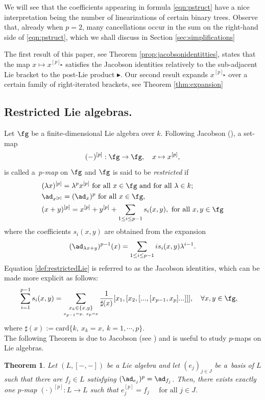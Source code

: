 \documentclass[12pt]{article}
\newcommand{\btr}{\blacktriangleright}
\newtheorem{theorem}{Theorem}[subsection]
\begin{document}
We will see that the coefficients appearing in formula \eqref{eqn:pstruct} have a nice interpretation being the number of linearizations of certain binary trees. Observe that, already when $p=2$, many cancellations occur in the sum on the right-hand side of \eqref{eqn:pstruct}, which we shall discuss in Section \ref{sec:simplifications} 

The first result of this paper, see Theorem \ref{prop:jacobsonidentitties}, states that the map $x \mapsto x^{[p]_{\btr}}$ satisfies the Jacobson identities relatively to the sub-adjacent Lie bracket to the post-Lie product $\btr$. Our second result expands $x^{[p]_{\btr}}$ over a certain family of right-iterated brackets, see Theorem \ref{thm:expansion}

 \subsection{Restricted Lie algebras.}\label{sec:restrictedLie}Let $\fg$ be a finite-dimensional Lie algebra over $k$. Following Jacobson (\cite{J}), a set-map 
    $$(-)^{[p]}:\fg\rightarrow \fg, \quad x\mapsto x^{[p]},
    $$ is called a~\textit{$p$-map} on $\fg$ and $\fg$ is said to be {\it restricted}  if 
\begin{align}
\label{def:restrictedLie}
&(\lambda x)^{[p]}=\lambda^p x^{[p]} \text{ for all } x\in \fg \text{ and for all } \lambda \in k; \nonumber\\
&\ad_{x^{[p]}}=(\ad_x)^p \text{ for all } x\in \fg, \nonumber \\
&(x+y)^{[p]}=x^{[p]}+y^{[p]}+\displaystyle\sum_{1\leq i\leq p-1}s_i(x,y), \text{ for all } x,y\in \fg 
\end{align}
where the coefficients $s_i(x,y)$ are obtained from the expansion
\begin{equation*}
(\ad_{\lambda x+y})^{p-1}(x)=\displaystyle\sum_{1\leq i \leq p-1} is_i(x,y) \lambda^{i-1}.
\end{equation*}
Equation \eqref{def:restrictedLie} is referred to as the Jacobson identities, which can be made more explicit as follows:
\begin{align}\label{si}
\sum_{i=1}^{p-1}s_i(x,y)&=\sum_{\underset{x_{p-1}=y,~x_p=x}{x_k\in\{x,y\}}}\frac{1}{\sharp(x)}[x_1,[x_2,[...,[x_{p-1},x_p]...]]],\quad \forall x,y\in \fg,
\end{align}
where $\sharp(x):=\text{card}\{k,~x_k=x,~k=1,\cdots,p\}$.\\

The following Theorem is due to Jacobson (see \cite{J}) and is useful to study $p$-maps on Lie algebras.
\begin{theorem}\label{thm:jacobson}
Let $(L,[-,-])$ be a Lie algebra and let $(e_j)_{j\in J}$ be a~basis of $L$ such that there are $f_j\in L$ satisfying $(\ad_{e_j})^p=\ad_{f_j}$. Then, there exists exactly one $p$-map  $(\cdot)^{[p]}:L\rightarrow L$ such that $e_j^{[p]}=f_j \quad \text{ for all $j\in J$}.$
\end{theorem}
 
\end{document}
